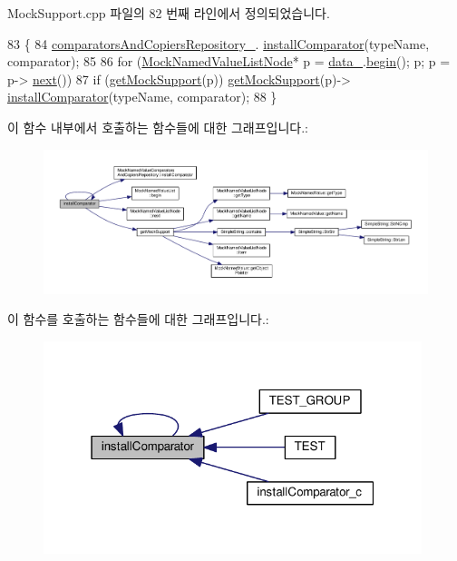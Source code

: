Mock\+Support.\+cpp 파일의 82 번째 라인에서 정의되었습니다.


\begin{DoxyCode}
83 \{
84     \hyperlink{class_mock_support_a372117e733b5aa30e4badf791416fd5f}{comparatorsAndCopiersRepository\_}.
      \hyperlink{class_mock_named_value_comparators_and_copiers_repository_a6a92283ccd382316f4e3f84ed4c7fa1b}{installComparator}(typeName, comparator);
85 
86     \textcolor{keywordflow}{for} (\hyperlink{class_mock_named_value_list_node}{MockNamedValueListNode}* p = \hyperlink{class_mock_support_a26b06d2d43a7804c9aa5808409c0c1ee}{data\_}.\hyperlink{class_mock_named_value_list_a4a5976d05542385eb64ea73eee7fc59c}{begin}(); p; p = p->
      \hyperlink{class_mock_named_value_list_node_adaf0ca3232d35f7efae1bade86b8027e}{next}())
87         \textcolor{keywordflow}{if} (\hyperlink{class_mock_support_a575951d416e49f54fd1a3fc4823609e3}{getMockSupport}(p)) \hyperlink{class_mock_support_a575951d416e49f54fd1a3fc4823609e3}{getMockSupport}(p)->
      \hyperlink{class_mock_support_a724ca1b858b51a67b3dc2bd8e77ff4a3}{installComparator}(typeName, comparator);
88 \}
\end{DoxyCode}


이 함수 내부에서 호출하는 함수들에 대한 그래프입니다.\+:
\nopagebreak
\begin{figure}[H]
\begin{center}
\leavevmode
\includegraphics[width=350pt]{class_mock_support_a724ca1b858b51a67b3dc2bd8e77ff4a3_cgraph}
\end{center}
\end{figure}




이 함수를 호출하는 함수들에 대한 그래프입니다.\+:
\nopagebreak
\begin{figure}[H]
\begin{center}
\leavevmode
\includegraphics[width=313pt]{class_mock_support_a724ca1b858b51a67b3dc2bd8e77ff4a3_icgraph}
\end{center}
\end{figure}


